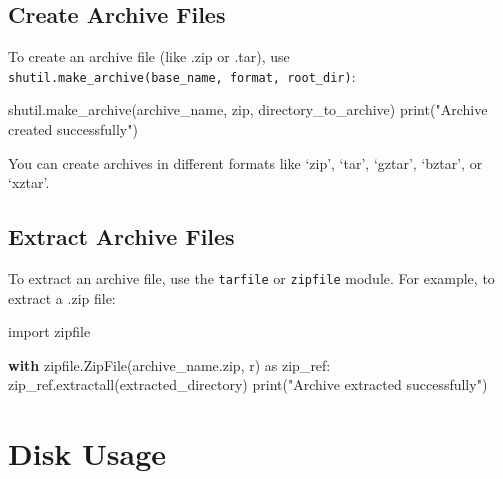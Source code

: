 \documentclass[
  letterpaper,
  DIV=11,
  numbers=noendperiod]{scrreprt}
\newenvironment{Shaded}{\begin{snugshade}}{\end{snugshade}}
\newcommand{\BuiltInTok}[1]{\textcolor[rgb]{0.00,0.23,0.31}{#1}}
\newcommand{\ControlFlowTok}[1]{\textcolor[rgb]{0.00,0.23,0.31}{\textbf{#1}}}
\newcommand{\ImportTok}[1]{\textcolor[rgb]{0.00,0.46,0.62}{#1}}
\newcommand{\NormalTok}[1]{\textcolor[rgb]{0.00,0.23,0.31}{#1}}
\newcommand{\StringTok}[1]{\textcolor[rgb]{0.13,0.47,0.30}{#1}}
\begin{document}
\subsection{Create Archive Files}\label{create-archive-files}

To create an archive file (like .zip or .tar), use
\texttt{shutil.make\_archive(base\_name,\ format,\ root\_dir)}:

\begin{Shaded}
\begin{Highlighting}[]
\NormalTok{shutil.make\_archive(}\StringTok{\textquotesingle{}archive\_name\textquotesingle{}}\NormalTok{, }\StringTok{\textquotesingle{}zip\textquotesingle{}}\NormalTok{, }\StringTok{\textquotesingle{}directory\_to\_archive\textquotesingle{}}\NormalTok{)}
\BuiltInTok{print}\NormalTok{(}\StringTok{"Archive created successfully"}\NormalTok{)}
\end{Highlighting}
\end{Shaded}

You can create archives in different formats like `zip', `tar', `gztar',
`bztar', or `xztar'.

\subsection{Extract Archive Files}\label{extract-archive-files}

To extract an archive file, use the \texttt{tarfile} or \texttt{zipfile}
module. For example, to extract a .zip file:

\begin{Shaded}
\begin{Highlighting}[]
\ImportTok{import}\NormalTok{ zipfile}

\ControlFlowTok{with}\NormalTok{ zipfile.ZipFile(}\StringTok{\textquotesingle{}archive\_name.zip\textquotesingle{}}\NormalTok{, }\StringTok{\textquotesingle{}r\textquotesingle{}}\NormalTok{) }\ImportTok{as}\NormalTok{ zip\_ref:}
\NormalTok{    zip\_ref.extractall(}\StringTok{\textquotesingle{}extracted\_directory\textquotesingle{}}\NormalTok{)}
\BuiltInTok{print}\NormalTok{(}\StringTok{"Archive extracted successfully"}\NormalTok{)}
\end{Highlighting}
\end{Shaded}

\section{Disk Usage}\label{disk-usage}
\end{document}
